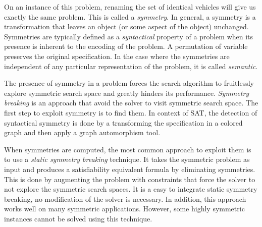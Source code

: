 On an instance of this problem, renaming the set of identical vehicles will give us exactly the same problem.
This is called a \textit{symmetry}. In general, a symmetry is a transformation that leaves an object (or some aspect of the object) unchanged. Symmetries are typically defined as a \textit{syntactical} property of a problem when its presence is inherent to the encoding of the problem. A permutation of variable preserves the original specification. In the case where the symmetries are independent of any 
particular representation of the problem, it is called \textit{semantic}.


The presence of symmetry in a problem forces the search algorithm to fruitlessly explore symmetric
search space and greatly hinders its performance. \textit{Symmetry breaking} is an approach that
avoid the solver to visit symmetric search space. The first step to exploit symmetry is to find them.
In context of SAT, the detection of syntactical symmetry is done by a transforming the specification
in a colored graph and then apply a graph automorphism tool.





%
%
%
%
%
%
%
%
%



When symmetries are computed, the most common approach to exploit them is to use a \emph{static symmetry breaking} technique.
It takes the symmetric problem as input and produces a satisfiability equivalent formula by eliminating symmetries. This is done by augmenting the problem with constraints that force the solver to not explore the symmetric search  spaces. It is a easy to integrate static symmetry breaking, no modification of the solver is necessary.
In addition, this approach works well on many symmetric applications.
However, some highly symmetric instances cannot be solved using this technique.


